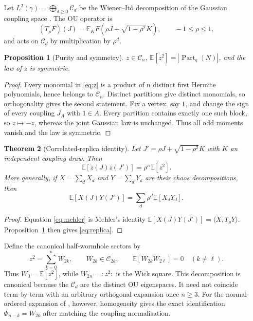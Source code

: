 \documentclass[11pt,a4paper]{article}
\newtheorem{theorem}{Theorem}[section]
\newtheorem{proposition}[theorem]{Proposition}
\theoremstyle{definition}
\theoremstyle{remark}
\newcommand{\E}{\mathbb{E}}
\newcommand{\Ccal}{\mathcal{C}}
\begin{document}
Let $L^2(\gamma)=\bigoplus_{d\ge0}\Ccal_d$ be the Wiener--It\^o decomposition of the
Gaussian coupling space \citep{Ito1951,Janson1997}.  The OU operator is
\begin{equation}
 (T_\rho F)(J)=\E_K F\!\left(\rho J+\sqrt{1-\rho^2}K\right),
 \qquad -1\le\rho\le1,
 \label{eq:OU}
\end{equation}
and acts on $\Ccal_d$ by multiplication by $\rho^d$.

\begin{proposition}[Purity and symmetry]\label{prop:purity}
$z\in\Ccal_n$, $\E[z^2]=|\operatorname{Part}_q(N)|$, and the law of $z$ is symmetric.
\end{proposition}

\begin{proof}
Every monomial in \eqref{eq:z} is a product of $n$ distinct first Hermite polynomials, hence
belongs to $\Ccal_n$.  Distinct partitions give distinct monomials, so orthogonality gives
the second statement.  Fix a vertex, say $1$, and change the sign of every coupling $J_A$
with $1\in A$.  Every partition contains exactly one such block, so $z\mapsto-z$, whereas
the joint Gaussian law is unchanged.  Thus all odd moments vanish and the law is symmetric.
\end{proof}

\begin{theorem}[Correlated-replica identity]\label{thm:replica}
Let $J'=\rho J+\sqrt{1-\rho^2}K$ with $K$ an independent coupling draw.  Then
\begin{equation}
 \E[z(J)z(J')]=\rho^n\E[z^2].
 \label{eq:replica}
\end{equation}
More generally, if $X=\sum_dX_d$ and $Y=\sum_dY_d$ are their chaos decompositions, then
\begin{equation}
 \E[X(J)Y(J')]=\sum_d\rho^d\E[X_dY_d].
 \label{eq:mehler}
\end{equation}
\end{theorem}

\begin{proof}
Equation \eqref{eq:mehler} is Mehler's identity
$\E[X(J)Y(J')]=\langle X,T_\rho Y\rangle$.  Proposition~\ref{prop:purity} then gives
\eqref{eq:replica}.
\end{proof}

Define the canonical half-wormhole sectors by
\begin{equation}
 z^2=\sum_{k=0}^{n}W_{2k},\qquad W_{2k}\in\Ccal_{2k},\qquad
 \E[W_{2k}W_{2\ell}]=0\quad(k\ne\ell).
 \label{eq:sectors}
\end{equation}
Thus $W_0=\E[z^2]$, while $W_{2n}=:\!z^2\!:$ is the Wick square.  This decomposition is
canonical because the $\Ccal_d$ are the distinct OU eigenspaces.  It need not coincide
term-by-term with an arbitrary orthogonal expansion once $n\ge3$.  For the normal-ordered
expansion of \citet{Mukhametzhanov2022}, however, homogeneity gives the exact identification
$\Phi_{n-k}=W_{2k}$ after matching the coupling normalisation.
\end{document}

